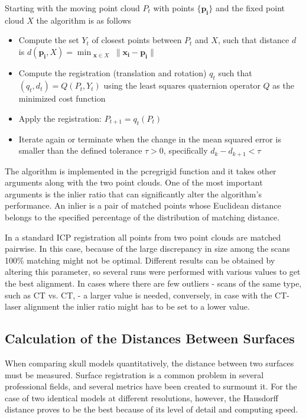 \documentclass[a4paper]{article}
\begin{document}
Starting with the moving point cloud $P_t$ with points $\{\boldsymbol{p_i}\}$ and the fixed point cloud $X$ the algorithm is as follows
\begin{itemize}
\item Compute the set $Y_t$ of closest points between $P_t$ and $X$, such that distance $d$ is
$d(\boldsymbol{p_i},X) = \min_{\substack{\boldsymbol{x} \in X}} \|\boldsymbol{x_i} - \boldsymbol{p_i}\|$
\item Compute the registration (translation and rotation) $q_t$ such that $(q_t,d_t) = Q(P_t,Y_t)$ using the least squares quaternion operator $Q$ as the minimized cost function
\item Apply the registration: $P_{t+1} = q_t(P_t)$
\item Iterate again or terminate when the change in the mean squared error is smaller than the defined tolerance $\tau > 0 $, specifically $d_k-d_{k+1} < \tau$
\end{itemize}

The algorithm is implemented in the {\selectfont pcregrigid} function and it takes other arguments along with the two point clouds. One of the most important arguments is the inlier ratio that can significantly alter the algorithm's performance. An inlier is a pair of matched points whose Euclidean distance belongs to the specified percentage of the distribution of matching distance. 

In a standard ICP registration all points from two point clouds are matched pairwise. In this case, because of the large discrepancy in size among the scans 100\% matching might not be optimal. Different results can be obtained by altering this parameter, so several runs were performed with various values to get the best alignment. In cases where there are few outliers -  scans of the same type, such as CT vs. CT, - a larger value is needed, conversely, in case with the CT-laser alignment the inlier ratio might has to be set to a lower value. 
\pagebreak
\subsection{Calculation of the Distances Between Surfaces} %
When comparing skull models quantitatively, the distance between two surfaces must be measured. Surface registration is a common problem in several professional fields, and several metrics have been created to surmount it. For the case of two identical models at different resolutions, however, the Hausdorff distance proves to be the best because of its level of detail and computing speed. 
\end{document}
